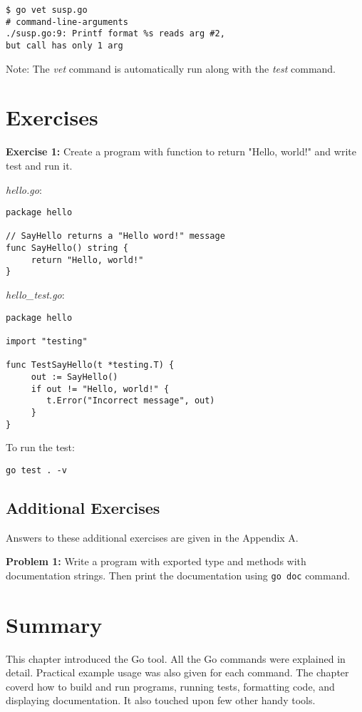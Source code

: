 
\begin{lstlisting}[numbers=none]
$ go vet susp.go
# command-line-arguments
./susp.go:9: Printf format %s reads arg #2,
but call has only 1 arg
\end{lstlisting}

Note: The \textit{vet} command is automatically run along with
the \textit{test} command.

\section{Exercises}

\textbf{Exercise 1:} Create a program with function to return "Hello, world!" and
write test and run it.

\textit{hello.go}:

\begin{lstlisting}[numbers=none]
package hello

// SayHello returns a "Hello word!" message
func SayHello() string {
     return "Hello, world!"
}
\end{lstlisting}

\textit{hello\_test.go}:

\begin{lstlisting}[numbers=none]
package hello

import "testing"

func TestSayHello(t *testing.T) {
     out := SayHello()
     if out != "Hello, world!" {
        t.Error("Incorrect message", out)
     }
}
\end{lstlisting}

To run the test:

\begin{lstlisting}[numbers=none]
go test . -v
\end{lstlisting}

\subsection{Additional Exercises}

Answers to these additional exercises are given in the Appendix A.

{\bfseries Problem 1:} Write a program with exported type and methods
with documentation strings.  Then print the documentation
using \texttt{go doc} command.

\section*{Summary}

This chapter introduced the Go tool.  All the Go commands were
explained in detail.  Practical example usage was also given for each
command.  The chapter coverd how to build and run programs, running
tests, formatting code, and displaying documentation.  It also touched
upon few other handy tools.
